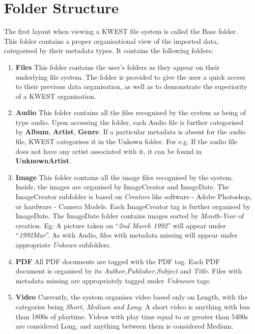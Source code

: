 \section{Folder Structure}

The first layout when viewing a KWEST file system is called the Base folder. This folder contains a proper organisational view of the imported data, categorised by their metadata types. It contains the following folders:

\begin{enumerate}
\item \textbf{Files} \newline
This folder contains the user's folders as they  appear on their underlying file system. The folder is provided to give the user a quick access to their previous data organisation, as well as to demonstrate the superiority of a KWEST organisation.
\item \textbf{Audio} \newline
This folder contains all the files recognised by the system as being of type audio. Upon accessing the folder, each Audio file is further categorised by \textbf{Album}, \textbf{Artist}, \textbf{Genre}. If a particular metadata is absent for the audio file, KWEST categorises it in the Unkown folder. \newline
For e.g. If the audio file does not have any artist associated with it, it can be found in \textbf{UnknownArtist}.

\item \textbf{Image} \newline
This folder contains all the image files recognised by the system. Inside, the images are organised by ImageCreator and ImageDate. 
The ImageCreator subfolder is based on \textit{Creators} like software - Adobe Photoshop, or hardware - Camera Models. Each ImageCreator tag is further organised by ImageDate. 
The ImageDate folder contains images sorted by \textit{Month-Year} of creation. Eg: A picture taken on ``\textit{2nd March 1992}'' will appear under ``\textit{1992Mar}''.
As with Audio, files with metadata missing will appear under appropriate \textit{Unkown} subfolders.

\item \textbf{PDF} \newline
All PDF documents are tagged with the PDF tag. Each PDF document is organised by its \textit{Author,Publisher,Subject} and \textit{Title}. Files with metadata missing are appropriately tagged under \textit{Unknown} tags.

\item \textbf{Video} \newline
Currently, the system organises video based only on Length, with the categories being \textit{Short, Medium and Long}. A short video is anything with less than 1800s of playtime. Videos with play time equal to or greater than 5400s are considered Long, and anything between them is considered Medium.	
\end{enumerate}